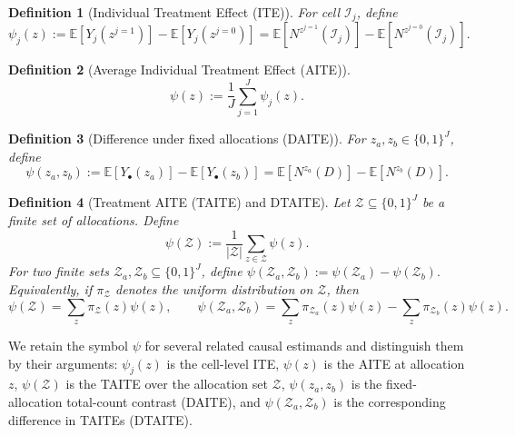 \documentclass{statsoc}
\newtheorem{definition}[definition]{Definition}
\newcommand{\bbE}{\mathbb{E}}
\newcommand{\1}{\mathbbm{1}}
\newcommand{\Nproc}{N}
\begin{document}
\begin{definition}[Individual Treatment Effect (ITE)]
For cell \(\mathcal I_j\), define
\[
\psi_j(z)
:=
\bbE\!\left[Y_j\!\left(z^{j=1}\right)\right]
-
\bbE\!\left[Y_j\!\left(z^{j=0}\right)\right]
=
\bbE\!\left[\Nproc^{z^{j=1}}(\mathcal I_j)\right]
-
\bbE\!\left[\Nproc^{z^{j=0}}(\mathcal I_j)\right].
\]
\end{definition}

\begin{definition}[Average Individual Treatment Effect (AITE)]
\[
\psi(z):=\frac{1}{J}\sum_{j=1}^J \psi_j(z).
\]
\end{definition}
\begin{definition}[Difference under fixed allocations (DAITE)]
For \(z_a,z_b\in\{0,1\}^J\), define
\[
\psi(z_a,z_b)
:=
\bbE\!\left[Y_\bullet(z_a)\right]
-
\bbE\!\left[Y_\bullet(z_b)\right]
=
\bbE\!\left[\Nproc^{z_a}(D)\right]
-
\bbE\!\left[\Nproc^{z_b}(D)\right].
\]
\end{definition}

\begin{definition}[Treatment AITE (TAITE) and DTAITE]
Let \(\mathcal Z\subseteq\{0,1\}^J\) be a finite set of allocations. Define
\[
\psi(\mathcal Z):=\frac{1}{|\mathcal Z|}\sum_{z\in\mathcal Z}\psi(z).
\]
For two finite sets \(\mathcal Z_a,\mathcal Z_b\subseteq\{0,1\}^J\), define
\(
\psi(\mathcal Z_a,\mathcal Z_b):=\psi(\mathcal Z_a)-\psi(\mathcal Z_b).
\)
Equivalently, if \(\pi_{\mathcal Z}\) denotes the uniform distribution on \(\mathcal Z\), then
\[
\psi(\mathcal Z)=\sum_{z}\pi_{\mathcal Z}(z)\psi(z),
\qquad
\psi(\mathcal Z_a,\mathcal Z_b)
=
\sum_z \pi_{\mathcal Z_a}(z)\psi(z)
-
\sum_z \pi_{\mathcal Z_b}(z)\psi(z).
\]
\end{definition}


We retain the symbol \(\psi\) for several related causal estimands and distinguish them by their arguments: \(\psi_j(z)\) is the cell-level ITE, \(\psi(z)\) is the AITE at allocation \(z\), \(\psi(\mathcal Z)\) is the TAITE over the allocation set \(\mathcal Z\), \(\psi(z_a,z_b)\) is the fixed-allocation total-count contrast (DAITE), and \(\psi(\mathcal Z_a,\mathcal Z_b)\) is the corresponding difference in TAITEs (DTAITE).
\end{document}
